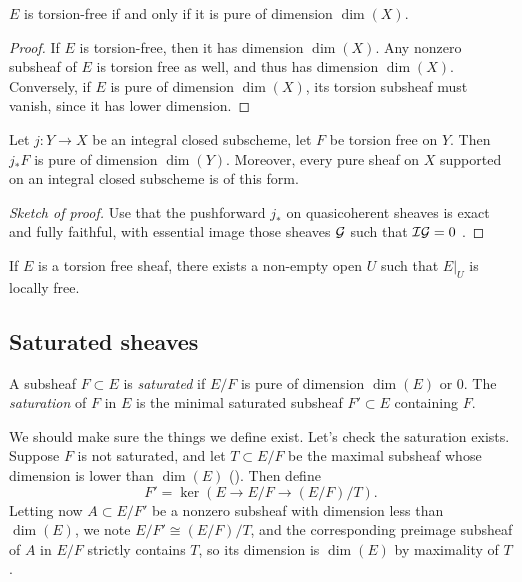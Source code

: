\begin{corollary}\label{cor:torsion-free-iff-pure-dim-X}
	$E$ is torsion-free if and only if it is pure of dimension $\dim(X)$. 
\end{corollary}
\begin{proof}
	If $E$ is torsion-free, then it has dimension $\dim(X)$. Any nonzero subsheaf of $E$ is torsion free as well, and thus has dimension $\dim(X)$. Conversely, if $E$ is pure of dimension $\dim(X)$, its torsion subsheaf must vanish, since it has lower dimension.
\end{proof}

\begin{corollary}
	Let $j: Y \to X$ be an integral closed subscheme, let $F$ be torsion free on $Y$. Then $j_*F$ is pure of dimension $\dim(Y)$. Moreover, every pure sheaf on $X$ supported on an integral closed subscheme is of this form. 
\end{corollary}
\begin{proof}[Sketch of proof]
	Use that the pushforward $j_*$ on quasicoherent sheaves is exact and fully faithful, with essential image those sheaves $\mathcal{G}$ such that $\mathcal{I}\mathcal{G} = 0$ \cite[\href{https://stacks.math.columbia.edu/tag/01QX}{Tag 01QX}]{stacks-project}.
\end{proof}

\begin{problem}
	If $E$ is a torsion free sheaf, there exists a non-empty open $U$ such that $E|_U$ is locally free.
\end{problem}

\subsection{Saturated sheaves}

\begin{definition}
	A subsheaf $F \subset E$ is \emph{saturated} if $E/F$ is pure of dimension $\dim(E)$ or $0$. The \emph{saturation} of $F$ in $E$ is the minimal saturated subsheaf $F' \subset E$ containing $F$. 
\end{definition}


We should make sure the things we define exist. Let's check the saturation exists. Suppose $F$ is not saturated, and let $T \subset E/F$ be the maximal subsheaf whose dimension is lower than $\dim(E)$ (). Then define \[
	F' = \ker(E \to E/F \to (E/F)/T).
\] 
Letting now $A \subset E/F'$ be a nonzero subsheaf with dimension less than $\dim(E)$, we note $E/F' \cong (E/F)/T$, and the corresponding preimage subsheaf of $A$ in $E/F$ strictly contains $T$, so its dimension is $\dim(E)$ by maximality of $T$. 


